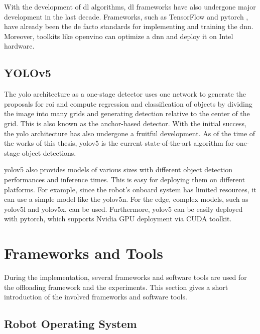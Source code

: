 With the development of \gls{dl} algorithms, \gls{dl} frameworks have also undergone major development in the last decade. Frameworks, such as TensorFlow \cite{MartinAbadi2015} and \gls{pytorch} \cite{Paszke2019}, have already been the de facto standards for implementing and training the \gls{dnn}. Moreover, toolkits like \gls{openvino} \cite{Demidovskij2019} can optimize a \gls{dnn} and deploy it on Intel hardware.

\subsection{YOLOv5}

The \gls{yolo} architecture \cite{Redmon2016} as a one-stage detector uses one network to generate the proposals for \gls{roi} and compute regression and classification of objects by dividing the image into many grids and generating detection relative to the center of the grid. This is also known as the anchor-based detector. With the initial success, the \gls{yolo} architecture has also undergone a fruitful development. As of the time of the works of this thesis, \gls{yolo}v5 \cite{Jocher2022} is the current state-of-the-art algorithm for one-stage object detections. 

\gls{yolo}v5 also provides models of various sizes with different object detection performances and inference times. This is easy for deploying them on different platforms. For example, since the robot's onboard system has limited resources, it can use a simple model like the \gls{yolo}v5n. For the edge, complex models, such as \gls{yolo}v5l and \gls{yolo}v5x, can be used. Furthermore, \gls{yolo}v5 can be easily deployed with \gls{pytorch}, which supports Nvidia GPU deployment via CUDA toolkit. 


\section{Frameworks and Tools}\label{sec:frameworks_and_tools}

During the implementation, several frameworks and software tools are used for the offloading framework and the experiments. This section gives a short introduction of the involved frameworks and software tools. 

\subsection{Robot Operating System}

